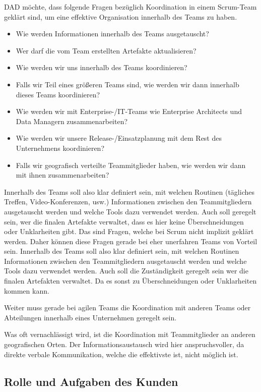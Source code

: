 DAD möchte, dass folgende Fragen bezüglich Koordination in einem Scrum-Team geklärt sind, um eine effektive Organisation innerhalb des Teams zu haben.
\begin{itemize}
	\item 	Wie werden Informationen innerhalb des Teams ausgetauscht?
	\item 	Wer darf die vom Team erstellten Artefakte aktualisieren? 
	\item 	Wie werden wir uns innerhalb des Teams koordinieren?
	\item 	Falls wir Teil eines größeren Teams sind, wie werden wir dann innerhalb dieses Teams koordinieren?
	\item 	Wie werden wir mit Enterprise-/IT-Teams wie Enterprise Architects und Data Managern zusammenarbeiten?
	\item 	Wie werden wir unsere Release-/Einsatzplanung mit dem Rest des Unternehmens koordinieren?
	\item 	Falls wir geografisch verteilte Teammitglieder haben, wie werden wir dann mit ihnen zusammenarbeiten?
\end{itemize}
Innerhalb des Teams soll also klar definiert sein, mit welchen Routinen (tägliches Treffen, Video-Konferenzen, usw.) Informationen zwischen den Teammitgliedern ausgetauscht werden und welche Tools dazu verwendet werden. Auch soll geregelt sein, wer die finalen Artefakte verwaltet, dass es hier keine Überschneidungen oder Unklarheiten gibt.
Das sind Fragen, welche bei Scrum nicht implizit geklärt werden. Daher können diese Fragen gerade bei eher unerfahren Teams von Vorteil sein.
Innerhalb des Teams soll also klar definiert sein, mit welchen Routinen Informationen zwischen den Teammitgliedern ausgetauscht werden und welche Tools dazu verwendet werden. Auch soll die Zuständigkeit geregelt sein wer die finalen Artefakten verwaltet. Da es sonst zu Überschneidungen oder Unklarheiten kommen kann.

Weiter muss gerade bei agilen Teams die Koordination mit anderen Teams oder Abteilungen innerhalb eines Unternehmen geregelt sein.

Was oft vernachlässigt wird, ist die Koordination mit Teammitglieder an anderen geografischen Orten. Der Informationsaustausch wird hier anspruchsvoller, da direkte verbale Kommunikation, welche die effektivste ist, nicht möglich ist.


\subsection{Rolle und Aufgaben des Kunden}

